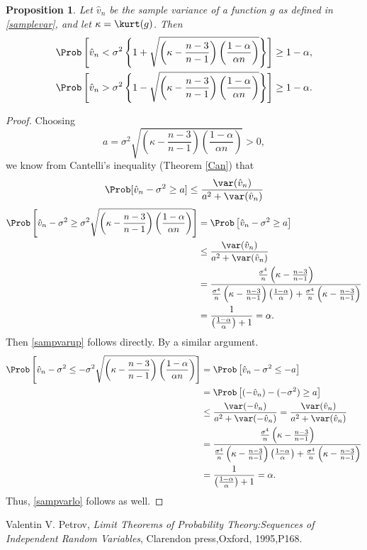 \documentclass[12pt]{amsart}
\newcommand{\hv}{\hat{v}}
\newtheorem{prop}[theorem]{Proposition}
\begin{document}
\begin{prop}\label{propCant} Let $\hv_n$ be the sample variance of a function $g$ as defined in \eqref{samplevar}, and let $\kappa=\kurt(g)$.  Then
\begin{subequations} \label{sampvarbd}
\begin{gather}\label{sampvarup}
\Prob\left[\hv_n < \sigma^2 \left\{1 + \sqrt{\left ( \kappa  - \frac{n-3}{n-1}\right)\left(\frac{1-\alpha}{\alpha n}\right)}\right\} \right] \ge 1 - \alpha, \\
\label{sampvarlo}
\Prob\left[\hv_n > \sigma^2 \left\{1 - \sqrt{\left ( \kappa  - \frac{n-3}{n-1}\right)\left(\frac{1-\alpha}{\alpha n}\right)}\right\} \right] \ge 1 - \alpha.
\end{gather}
\end{subequations}
\end{prop}
\begin{proof}Choosing
$$a=\sigma^2\sqrt{\left(\kappa-\frac{n-3}{n-1}\right)\left(\frac{1-\alpha}{\alpha n}\right)} >0,
$$
we know from Cantelli's inequality (Theorem \ref{Can})  that
$$\Prob[\hv_n-\sigma^2 \geq
a]\leq\frac{\var(\hv_n)}{a^2+\var(\hv_n)}$$
\begin{align*}
\Prob\left[\hv_n-\sigma^2 \geq
\sigma^2\sqrt{\left(\kappa-\frac{n-3}{n-1}\right)\left(\frac{1-\alpha}{\alpha n}\right)} \right] & = \Prob\left[\hv_n-\sigma^2 \geq
a \right]\\
& \leq\frac{\var(\hv_n)}{a^2+\var(\hv_n)}\\
&= \frac{\frac{\sigma^4}{n}\left(\kappa - \frac{n-3}{n-1}\right)}{\frac{\sigma^4}{n}\left(\kappa - \frac{n-3}{n-1}\right)\left(\frac{1-\alpha}{\alpha}\right)+\frac{\sigma^4}{n}\left(\kappa - \frac{n-3}{n-1}\right)} \\
&=\frac{1}{\left(\frac{1-\alpha}{\alpha}\right)+1}=\alpha.
\end{align*}
Then \eqref{sampvarup} follows directly.  By a similar argument.
\begin{align*}
\Prob\left[\hv_n-\sigma^2 \le
- \sigma^2\sqrt{\left(\kappa-\frac{n-3}{n-1}\right)\left(\frac{1-\alpha}{\alpha n}\right)} \right] & = \Prob\left[\hv_n-\sigma^2 \le -a \right]\\
& = \Prob\left[(-\hv_n)-(-\sigma^2) \ge a \right]\\& \leq\frac{\var(-\hv_n)}{a^2+\var(-\hv_n)}= \frac{\var(\hv_n)}{a^2+\var(\hv_n)}\\
&= \frac{\frac{\sigma^4}{n}\left(\kappa - \frac{n-3}{n-1}\right)}{\frac{\sigma^4}{n}\left(\kappa - \frac{n-3}{n-1}\right)\left(\frac{1-\alpha}{\alpha}\right)+\frac{\sigma^4}{n}\left(\kappa - \frac{n-3}{n-1}\right)} \\
&=\frac{1}{\left(\frac{1-\alpha}{\alpha}\right)+1}=\alpha.
\end{align*}
Thus, \eqref{sampvarlo} follows as well.
\end{proof}

\begin{thebibliography}{99}
Valentin V. Petrov, \emph{Limit Theorems of Probability Theory:Sequences of Independent Random Variables},
Clarendon press,Oxford, 1995,P168.
\end{thebibliography}
\end{document}
